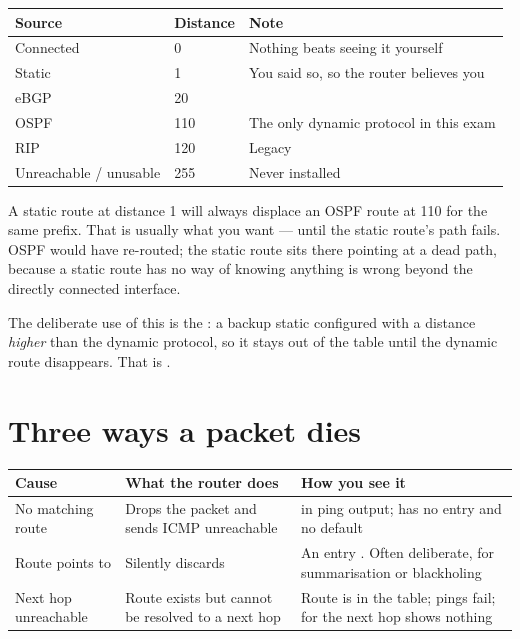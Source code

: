 \begin{longtable}{@{}L{5.4cm}C{2.6cm}L{7.2cm}@{}}
\toprule
{}
\textbf{Source} & \textbf{Distance} & \textbf{Note} \\
\midrule
\endhead
Connected & 0 & Nothing beats seeing it yourself \\
Static & 1 & You said so, so the router believes you \\
eBGP & 20 & \\
OSPF & 110 & The only dynamic protocol in this exam \\
RIP & 120 & Legacy \\
Unreachable / unusable & 255 & Never installed \\
\bottomrule
\end{longtable}

\begin{conceptbox}
A static route at distance 1 will always displace an OSPF route at 110 for the
same prefix. That is usually what you want --- until the static route's path
fails. OSPF would have re-routed; the static route sits there pointing at a dead
path, because a static route has no way of knowing anything is wrong beyond the
directly connected interface.

The deliberate use of this is the : a backup static
configured with a distance \emph{higher} than the dynamic protocol, so it stays
out of the table until the dynamic route disappears. That is .
\end{conceptbox}

\section{Three ways a packet dies}

\begin{longtable}{@{}L{3.6cm}L{5.2cm}L{6.2cm}@{}}
\toprule
{}
\textbf{Cause} & \textbf{What the router does} & \textbf{How you see it} \\
\midrule
\endhead
No matching route & Drops the packet and sends ICMP unreachable &
 in ping output;  has no entry and no default \\
Route points to  & Silently discards & An entry
. Often deliberate, for summarisation or blackholing \\
Next hop unreachable & Route exists but cannot be resolved to a next hop &
Route is in the table; pings fail;  for the next hop shows
nothing \\
\bottomrule
\end{longtable}


